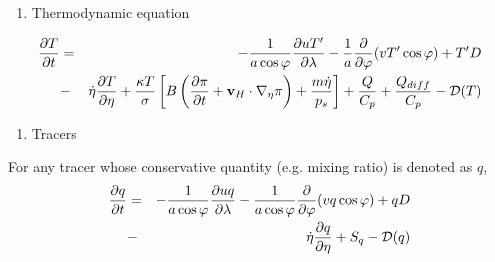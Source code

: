 \begin{enumerate}
\def\labelenumi{\arabic{enumi}.}
\setcounter{enumi}{3}
\tightlist
\item
  Thermodynamic equation
\end{enumerate}
\begin{eqnarray}
  \frac{\partial T}{\partial t}
     &=&  - \frac{1}{a\cos\varphi}
               \frac{\partial uT'}{\partial \lambda}
          - \frac{1}{a}
               \frac{\partial }{\partial \varphi} ( vT' \cos\varphi )
          + T' D \notag \\
        &-& \dot{\eta} 
              \frac{\partial T }{\partial \eta}
          + \frac{\kappa T}{\sigma} \left[ B\left( \frac{\partial \pi}{\partial t}
                            + {\mathbf{v}}_{H} \cdot \nabla_{\eta}\pi \right)
                            + \frac{ m\dot{\eta} }{ p_s }
                     \right]
          + \frac{Q}{C_{p}}
          + \frac{Q_{diff}}{C_{p}}
          - {\mathcal D}(T) 
\end{eqnarray}

\begin{enumerate}
\def\labelenumi{\arabic{enumi}.}
\setcounter{enumi}{4}
\tightlist
\item
  Tracers
\end{enumerate}

For any tracer whose conservative quantity (e.g. mixing ratio) is denoted as \(q\),
\begin{eqnarray}
  \frac{\partial q}{\partial t}
   &=&  - \frac{1}{a\cos\varphi}
               \frac{\partial uq}{\partial \lambda}
          - \frac{1}{a\cos\varphi}
               \frac{\partial }{\partial \varphi} (vq \cos\varphi)
          + q D \notag \\
        &-& \dot{\eta} \frac{\partial q }{\partial \eta}
          + S_{q}
          - {\mathcal D}(q) 
\end{eqnarray}

